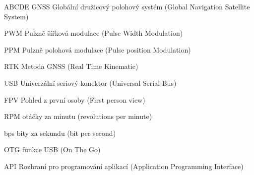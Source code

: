 \begin{seznamzkratek}{ABCDE}
          {GNSS}
          {Globální družicový polohový systém (Global Navigation Satellite System)} 
          
          {PWM}
          {Pulzně šířková modulace (Pulse Width Modulation)}
          
          {PPM}
          {Pulzně polohová modulace (Pulse position Modulation)}
          
          
          {RTK}
          {Metoda GNSS (Real Time Kinematic)}
          
          {USB}
          {Univerzální seriový konektor (Universal Serial Bus)}
          
          {FPV}
          {Pohled z první osoby (First person view)}
          
          {RPM}
          {otáčky za minutu (revolutions per minute)}
          
          {bps}
          {bity za sekundu (bit per second)}
          
          {OTG}
          {funkce USB (On The Go)}
          
          {API}
          {Rozhraní pro programování aplikací (Application Programming Interface)}

\end{seznamzkratek}
